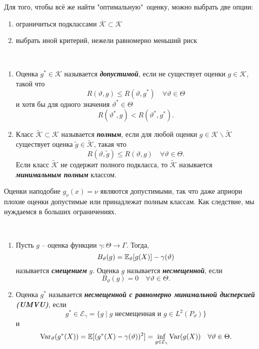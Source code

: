 \begin{rmrk}
	Для того, чтобы всё же найти "оптимальную"\ оценку, можно выбрать две опции:
	\begin{enumerate}
		\item ограничиться подклассами $\overline{\mathcal{K}} \subset \mathcal{K}$
		\item выбрать иной критерий, нежели равномерно меньший риск
	\end{enumerate}
\end{rmrk}

\begin{defn} \
	\begin{enumerate}
		\item Оценка $g^* \in \mathcal{K}$ называется \textbf{\textit{допустимой}}, если не существует оценки $g \in \mathcal{K}$, такой что
		 \[R(\vartheta, g) \leq R(\vartheta, g^*) \quad \forall \vartheta \in \Theta \]
		 и хотя бы для одного значения $\vartheta^* \in \Theta$
		 \[ R(\vartheta^*, g) < R(\vartheta^*, g^*).\]
		\item Класс $\tilde{\mathcal{K}} \subset \mathcal{K}$ называется \textbf{\textit{полным}}, если для любой оценки $g \in \mathcal{K} \backslash \tilde{\mathcal{K}}$ существует оценка $\tilde{g} \in \tilde{\mathcal{K}}$, такая что
		\[ R(\vartheta, \tilde{g}) \leq R(\vartheta, g) \quad \forall \vartheta \in \Theta. \]
		Если класс $\tilde{\mathcal{K}}$ не содержит полного подкласса, то $\tilde{\mathcal{K}}$ называется \textbf{\textit{минимальным полным}} классом.
	\end{enumerate}
\end{defn}

\begin{rmrk}
	Оценки наподобие $g_\nu(x)=\nu$ являются допустимыми, так что даже априори плохие оценки допустимые или принадлежат полным классам. Как следствие, мы нуждаемся в больших ограничениях.
\end{rmrk}

\begin{defn} \
	\begin{enumerate}
		\item Пусть $g$ -- оценка функции $\gamma: \Theta \rightarrow \Gamma$. Тогда,
		\[ B_\vartheta(g)=\mathbb{E}_\vartheta[g(X)]-\gamma(\vartheta) \]
		называется \textbf{\textit{смещением}} $g$. Оценка $g$ называется \textbf{\textit{несмещенной}}, если
		 \[B_\vartheta(g)=0 \quad  \forall \vartheta \in \Theta.\]
		\item Оценка $g^*$ называется \textbf{\textit{несмещенной с равномерно минимальной дисперсией (UMVU)}}, если 
		\[g^* \in \mathcal{E}_\gamma = \{ g \mid g \text{ несмещенная и } g \in L^2(P_\vartheta) \}\]
		и
		\begin{equation} \label{eq2.1} 
		\mathrm{Var}_\vartheta(g^*(X))=\mathbb{E}[(g^*(X) - \gamma(\vartheta))^2]=\inf_{g \in \mathcal{E}_\gamma} \mathrm{Var}(g(X)) \quad \forall \vartheta \in \Theta.
		\end{equation}
	\end{enumerate}
\end{defn}

